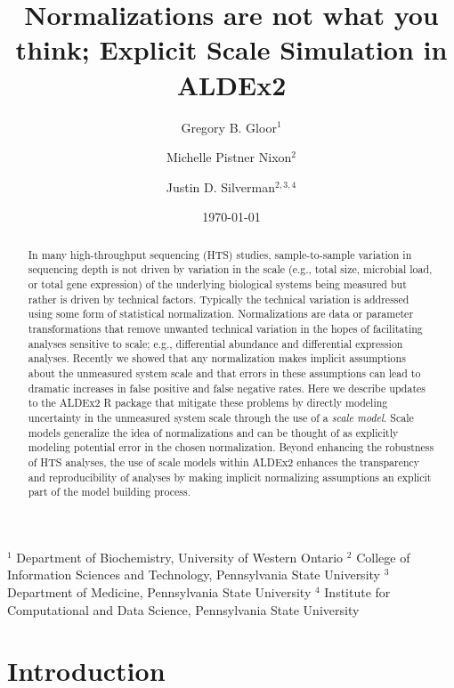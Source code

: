 \documentclass[
]{article}
\title{Normalizations are not what you think; Explicit Scale Simulation
in ALDEx2}
\author{Gregory B. Gloor$^1$ \and Michelle Pistner Nixon$^2$ \and Justin D. Silverman$^{2,3,4}$}
\date{\today}
\begin{document}
\maketitle

$^1$ Department of Biochemistry, University of Western Ontario
$^2$ College of Information Sciences and Technology, Pennsylvania  State University
$^3$ Department of Medicine, Pennsylvania  State University
$^4$ Institute for Computational and Data Science, Pennsylvania State University

\begin{abstract}
In many high-throughput sequencing (HTS) studies, sample-to-sample
variation in sequencing depth is not driven by variation in the scale
(e.g., total size, microbial load, or total gene expression) of the
underlying biological systems being measured but rather is driven by
technical factors. Typically the technical variation is addressed using
some form of statistical normalization. Normalizations are data or
parameter transformations that remove unwanted technical variation in
the hopes of facilitating analyses sensitive to scale; e.g.,
differential abundance and differential expression analyses. Recently we
showed that any normalization makes implicit assumptions about the
unmeasured system scale and that errors in these assumptions can lead to
dramatic increases in false positive and false negative rates. Here we
describe updates to the ALDEx2 R package that mitigate these problems by
directly modeling uncertainty in the unmeasured system scale through the
use of a \textit{scale model}. Scale models generalize the idea of
normalizations and can be thought of as explicitly modeling potential
error in the chosen normalization. Beyond enhancing the robustness of
HTS analyses, the use of scale models within ALDEx2 enhances the
transparency and reproducibility of analyses by making implicit
normalizing assumptions an explicit part of the model building process.
\end{abstract}

\hypertarget{introduction}{%
\section{Introduction}\label{introduction}}
\end{document}
